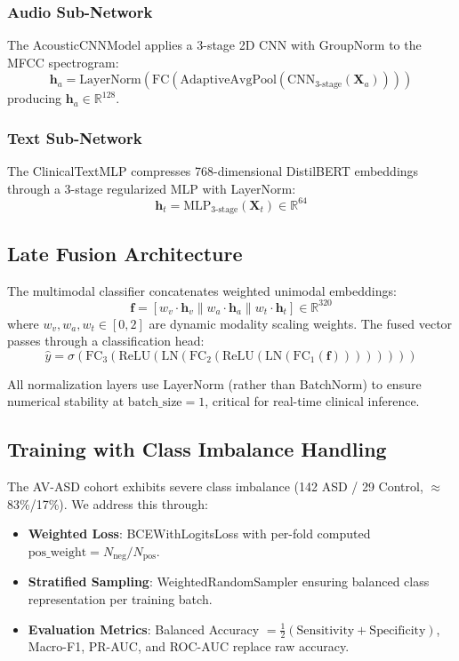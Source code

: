 \documentclass[conference]{IEEEtran}
\begin{document}
\subsubsection{Audio Sub-Network}
The AcousticCNNModel applies a 3-stage 2D CNN with GroupNorm to the MFCC spectrogram:
\begin{equation}
    \mathbf{h}_a = \text{LayerNorm}(\text{FC}(\text{AdaptiveAvgPool}(\text{CNN}_{3\text{-stage}}(\mathbf{X}_a))))
\end{equation}
producing $\mathbf{h}_a \in \mathbb{R}^{128}$.

\subsubsection{Text Sub-Network}
The ClinicalTextMLP compresses 768-dimensional DistilBERT embeddings through a 3-stage regularized MLP with LayerNorm:
\begin{equation}
    \mathbf{h}_t = \text{MLP}_{3\text{-stage}}(\mathbf{X}_t) \in \mathbb{R}^{64}
\end{equation}

\subsection{Late Fusion Architecture}

The multimodal classifier concatenates weighted unimodal embeddings:
\begin{equation}
    \mathbf{f} = [w_v \cdot \mathbf{h}_v \| w_a \cdot \mathbf{h}_a \| w_t \cdot \mathbf{h}_t] \in \mathbb{R}^{320}
\end{equation}
where $w_v, w_a, w_t \in [0, 2]$ are dynamic modality scaling weights. The fused vector passes through a classification head:
\begin{equation}
    \hat{y} = \sigma(\text{FC}_3(\text{ReLU}(\text{LN}(\text{FC}_2(\text{ReLU}(\text{LN}(\text{FC}_1(\mathbf{f}))))))))
\end{equation}

All normalization layers use LayerNorm (rather than BatchNorm) to ensure numerical stability at $\text{batch\_size}=1$, critical for real-time clinical inference.

\subsection{Training with Class Imbalance Handling}

The AV-ASD cohort exhibits severe class imbalance (142 ASD / 29 Control, $\approx$83\%/17\%). We address this through:
\begin{itemize}
    \item \textbf{Weighted Loss}: BCEWithLogitsLoss with per-fold computed $\text{pos\_weight} = N_{\text{neg}} / N_{\text{pos}}$.
    \item \textbf{Stratified Sampling}: WeightedRandomSampler ensuring balanced class representation per training batch.
    \item \textbf{Evaluation Metrics}: Balanced Accuracy $= \frac{1}{2}(\text{Sensitivity} + \text{Specificity})$, Macro-F1, PR-AUC, and ROC-AUC replace raw accuracy.
\end{itemize}
\end{document}
